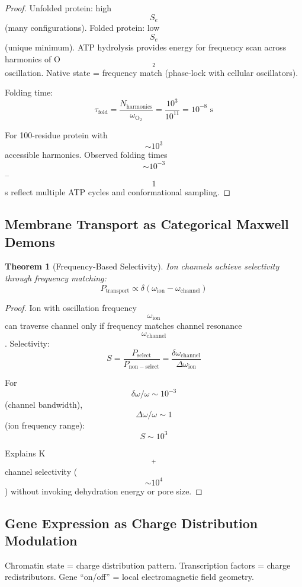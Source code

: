 \documentclass[11pt,twocolumn,a4paper]{article}
\newtheorem{theorem}{Theorem}[section]
\theoremstyle{remark}
\begin{document}
\begin{proof}
Unfolded protein: high $$S_e$$ (many configurations). Folded protein: low $$S_e$$ (unique minimum). ATP hydrolysis provides energy for frequency scan across harmonics of O$$_2$$ oscillation. Native state = frequency match (phase-lock with cellular oscillators).

Folding time:
$$
\tau_{\mathrm{fold}} = \frac{N_{\mathrm{harmonics}}}{\omega_{\mathrm{O}_2}} = \frac{10^3}{10^{11}} = 10^{-8} \text{ s}
$$

For 100-residue protein with $$\sim 10^3$$ accessible harmonics. Observed folding times $$\sim 10^{-3}$$--$$1$$ s reflect multiple ATP cycles and conformational sampling.
\end{proof}

\subsection{Membrane Transport as Categorical Maxwell Demons}

\begin{theorem}[Frequency-Based Selectivity]
\label{thm:membrane_selectivity}
Ion channels achieve selectivity through frequency matching:
$$
P_{\mathrm{transport}} \propto \delta(\omega_{\mathrm{ion}} - \omega_{\mathrm{channel}})
$$
\end{theorem}

\begin{proof}
Ion with oscillation frequency $$\omega_{\mathrm{ion}}$$ can traverse channel only if frequency matches channel resonance $$\omega_{\mathrm{channel}}$$. Selectivity:
$$
S = \frac{P_{\mathrm{select}}}{P_{\mathrm{non-select}}} = \frac{\delta\omega_{\mathrm{channel}}}{\Delta\omega_{\mathrm{ion}}}
$$

For $$\delta\omega/\omega \sim 10^{-3}$$ (channel bandwidth), $$\Delta\omega/\omega \sim 1$$ (ion frequency range):
$$
S \sim 10^3
$$

Explains K$$^+$$ channel selectivity ($$\sim 10^4$$) without invoking dehydration energy or pore size.
\end{proof}

\subsection{Gene Expression as Charge Distribution Modulation}

Chromatin state = charge distribution pattern. Transcription factors = charge redistributors. Gene ``on/off'' = local electromagnetic field geometry.
\end{document}
